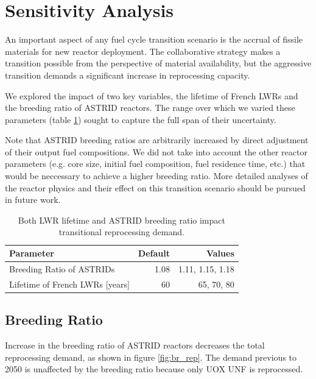 \section{Sensitivity Analysis}

An important aspect of any fuel cycle transition scenario
is the accrual of fissile materials for new reactor deployment.
The collaborative strategy makes a transition possible 
from the perspective of material availability,
but the aggressive transition demands a significant increase in reprocessing capacity.

We explored the impact of two key variables, the lifetime of French \glspl{LWR} and the
breeding ratio of \gls{ASTRID} reactors. The range over which we varied these parameters (table \ref{tab:sen_par})
sought to capture the full span of their uncertainty.

Note that \gls{ASTRID} breeding ratios are arbitrarily increased
by direct adjustment of their output fuel compositions. We did not 
take into account the other reactor parameters (e.g. core size, initial
fuel composition, fuel residence time, etc.)
that would be neccessary to achieve a higher breeding ratio. More detailed analyses
of the reactor physics and their effect on this transition scenario 
should be pursued in future work.


\begin{table}[h]
    \centering
    \caption{Both \gls{LWR} lifetime and \gls{ASTRID} breeding ratio impact 
    transitional reprocessing demand.}
    \begin{tabularx}{\textwidth}{lrr}
        \hline
        \textbf{Parameter} & \textbf{Default} & \textbf{Values} \\
        \hline
        Breeding Ratio of \glspl{ASTRID} & 1.08 & 1.11, 1.15, 1.18 \\ 
        Lifetime of French \glspl{LWR} [years] & 60  & 65, 70, 80 \\
        \hline
    \end{tabularx}
    \label{tab:sen_par}
\end{table}

\subsection{Breeding Ratio}


Increase in the breeding ratio of \gls{ASTRID} reactors
decreases the total reprocessing demand, as shown in 
figure \ref{fig:br_rep}.
The demand previous to 2050 is unaffected by the 
breeding ratio because only \gls{UOX} \gls{UNF} is reprocessed.

